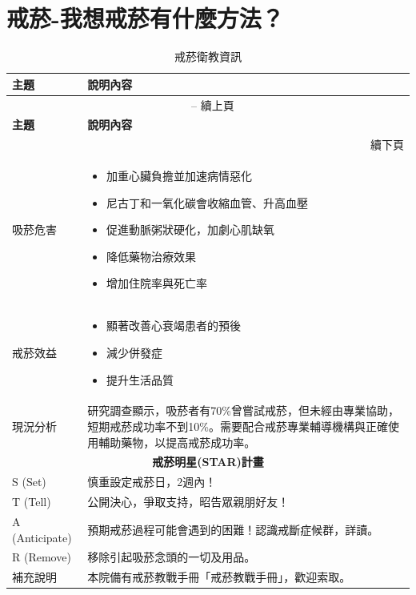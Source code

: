 \documentclass[nols]{tufte-book}
\begin{document}
\chapter{戒菸-我想戒菸有什麼方法？}
\begin{longtable}{|p{}|p{}|}
\caption{戒菸衛教資訊} \label{tab:smoking} \\
\hline
\textbf{主題} & \textbf{說明內容} \\
\hline
\endfirsthead

\multicolumn{2}{c}{\tablename\ \thetable{} -- 續上頁} \\
\hline
\textbf{主題} & \textbf{說明內容} \\
\hline
\endhead

\hline
\multicolumn{2}{r}{續下頁} \\
\endfoot

\hline
\endlastfoot

吸菸危害 & 
\begin{itemize}
\item 加重心臟負擔並加速病情惡化
\item 尼古丁和一氧化碳會收縮血管、升高血壓
\item 促進動脈粥狀硬化，加劇心肌缺氧
\item 降低藥物治療效果
\item 增加住院率與死亡率
\end{itemize} \\
\hline

戒菸效益 & 
\begin{itemize}
\item 顯著改善心衰竭患者的預後
\item 減少併發症
\item 提升生活品質
\end{itemize} \\
\hline

現況分析 & 研究調查顯示，吸菸者有70\%曾嘗試戒菸，但未經由專業協助，短期戒菸成功率不到10\%。需要配合戒菸專業輔導機構與正確使用輔助藥物，以提高戒菸成功率。 \\
\hline

\multicolumn{2}{|c|}{\textbf{戒菸明星(STAR)計畫}} \\
\hline

S (Set) & 慎重設定戒菸日，2週內！ \\
\hline

T (Tell) & 公開決心，爭取支持，昭告眾親朋好友！ \\
\hline

A (Anticipate) & 預期戒菸過程可能會遇到的困難！認識戒斷症候群，詳讀。 \\
\hline

R (Remove) & 移除引起吸菸念頭的一切及用品。 \\
\hline

補充說明 & 本院備有戒菸教戰手冊「戒菸教戰手冊」，歡迎索取。 \\

\end{longtable}
\end{document}
